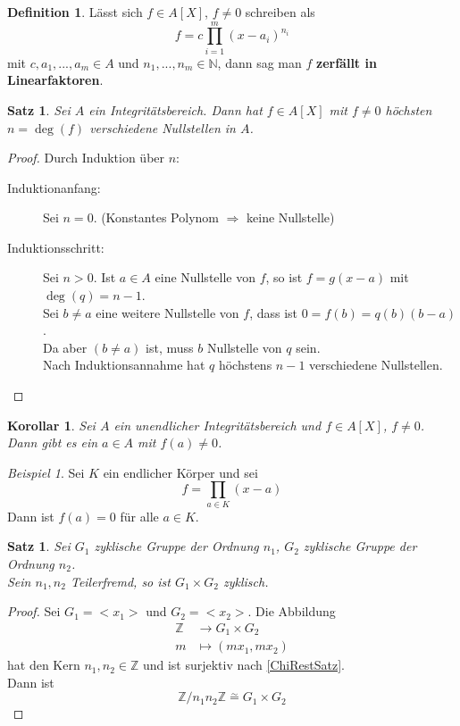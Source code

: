 \documentclass[10pt,a4paper]{article}
\newcommand{\N}{\ensuremath{\mathbb{N}}}
\newcommand{\Z}{\ensuremath{\mathbb{Z}}}
\newcommand{\isom}{\overset{\sim}{=}}
\theoremstyle{plain}
\newtheorem{kor}[theorem]{Korollar}
\newtheorem{satz}[theorem]{Satz}
\theoremstyle{definition}
\newtheorem{definition}[theorem]{Definition}
\theoremstyle{remark}
\newtheorem{exm}[theorem]{Beispiel}
\begin{document}
	\begin{definition}
		Lässt sich $f\in A[X]$, $f\neq 0$ schreiben als
		\[f=c\prod_{i=1}^{m}(x-a_i)^{n_i}\]
		mit $c,a_1,...,a_m\in A$ und $n_1,...,n_m\in\N$, dann sag man $f$ \textbf{zerfällt in Linearfaktoren}.
	\end{definition}

	\begin{satz}\label{satz:polyNst}
		Sei $A$ ein Integritätsbereich. Dann hat $f\in A[X]$ mit $f\neq 0$ höchsten $n=\deg(f)$ verschiedene Nullstellen in $A$.
	\end{satz}
	\begin{proof}
		Durch Induktion über $n$:
		\begin{description}
			\item[Induktionanfang:] Sei $n=0$. (Konstantes Polynom $\Rightarrow$ keine Nullstelle)
			\item[Induktionsschritt:] Sei $n>0$. Ist $a\in A$ eine Nullstelle von $f$, so ist $f=g(x-a)$ mit $\deg(q)=n-1$.\\
			Sei $b\neq a$ eine weitere Nullstelle von $f$, dass ist $0=f(b)=q(b)(b-a)$.\\
			Da aber $(b\neq a)$ ist, muss $b$ Nullstelle von $q$ sein.\\
			Nach Induktionsannahme hat $q$ höchstens $n-1$ verschiedene Nullstellen.
		\end{description}
	\end{proof}

	\begin{kor}
		Sei $A$ ein unendlicher Integritätsbereich und $f\in A[X]$, $f\neq0$. Dann gibt es ein $a\in A$ mit $f(a)\neq 0$.
	\end{kor}

	\begin{exm}
		Sei $K$ ein endlicher Körper und sei
		\[f=\prod_{a\in K}(x-a)\]
		Dann ist $f(a)=0$ für alle $a\in K$.
	\end{exm}

	\begin{satz}
		Sei $G_1$ zyklische Gruppe der Ordnung $n_1$, $G_2$ zyklische Gruppe der Ordnung $n_2$.\\
		Sein $n_1,n_2$ Teilerfremd, so ist $G_1\times G_2$ zyklisch.
	\end{satz}

	\begin{proof}
		Sei $G_1=<x_1>$ und $G_2=<x_2>$. Die Abbildung
		\begin{align*}
		\Z&\to G_1\times G_2\\
		m&\mapsto (mx_1,mx_2)
		\end{align*}
		hat den Kern $n_1,n_2\in\Z$ und ist surjektiv nach \ref{ChiRestSatz}.\\
		Dann ist
		\[\Z/n_1n_2\Z\isom G_1\times G_2\] 
	\end{proof}
\end{document}
